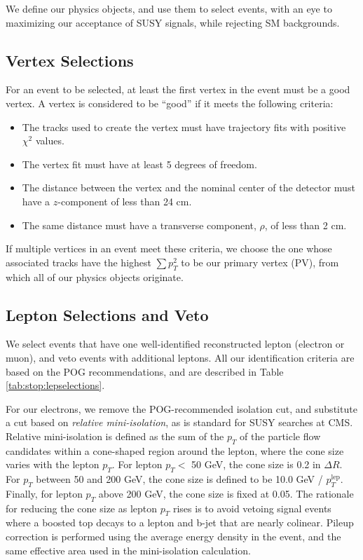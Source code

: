 We define our physics objects, and use them to select events, with an
eye to maximizing our acceptance of SUSY signals, while rejecting SM backgrounds.

\subsection{Vertex Selections}
\label{ssec:stop:vtxselections}

For an event to be selected, at least the first vertex in the event
must be a good vertex. A vertex is considered to be ``good'' if it
meets the following criteria:

\begin{itemize}
\item The tracks used to create the vertex must have trajectory fits
  with positive $\chi^2$ values.
\item The vertex fit must have at least 5 degrees of freedom.
\item The distance between the vertex and the nominal center of the
  detector must have a $z$-component of less than 24 cm.
\item The same distance must have a transverse component, $\rho$, of
  less than 2 cm.
\end{itemize}

If multiple vertices in an event meet these criteria, we choose the
one whose associated tracks have the highest $\sum p_T^2$ to be our
primary vertex (PV), from which all of our physics objects originate.

\subsection{Lepton Selections and Veto}
\label{ssec:stop:lepselections}

We select events that have one well-identified reconstructed lepton
(electron or muon), and veto events with additional leptons. All our
identification criteria are based on the POG recommendations, and are
described in Table \ref{tab:stop:lepselections}.

For our electrons, we remove the POG-recommended isolation cut, and
substitute a cut based on \emph{relative mini-isolation}, as is standard for
SUSY searches at CMS. Relative mini-isolation is defined as the sum of
the $p_T$ of the particle flow candidates within a cone-shaped region
around the lepton, where the cone size varies with the lepton
$p_T$. For lepton $p_T <$ 50 GeV, the cone size is 0.2 in $\Delta
R$. For $p_T$ between 50 and 200 GeV, the cone size is defined to be
10.0 GeV / $p_T^{\text{lep}}$. Finally, for lepton $p_T$ above 200 GeV, the
cone size is fixed at 0.05. The rationale for reducing the cone size
as lepton $p_T$ rises is to avoid vetoing signal events
where a boosted top decays to a lepton and b-jet that are nearly
colinear. Pileup correction is performed using the average energy
density in the event, and the same effective area used in the
mini-isolation calculation.

